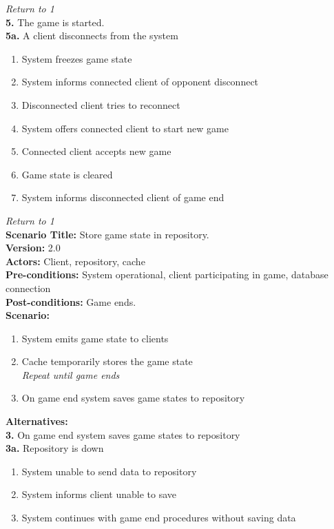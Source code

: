 \documentclass[letterpaper,12pt]{article}
\begin{document}
\emph{Return to 1}\\
\textbf{5.} The game is started. \\
\textbf{5a.} A client disconnects from the system \\
\begin{enumerate}
\item System freezes game state
\item System informs connected client of opponent disconnect
\item Disconnected client tries to reconnect
\item System offers connected client to start new game
\item Connected client accepts new game
\item Game state is cleared
\item System informs disconnected client of game end
\end{enumerate}
\emph{Return to 1}\\


\noindent \textbf{Scenario Title:} Store game state in repository.\\
\textbf{Version:} 2.0\\
\textbf{Actors:} Client, repository, cache\\
\textbf{Pre-conditions:} System operational, client participating in game, database connection\\
\textbf{Post-conditions:} Game ends.\\
\textbf{Scenario:}
\begin{enumerate}
\item System emits game state to clients
\item Cache temporarily stores the game state \\
\emph{Repeat until game ends}
\item On game end system saves game states to repository
\end{enumerate}
\textbf{Alternatives:}\\
\textbf{3.} On game end system saves game states to repository \\
\textbf{3a.} Repository is down
\begin {enumerate}
\item System unable to send data to repository
\item System informs client unable to save
\item System continues with game end procedures without saving data
\end {enumerate}
\end{document}
